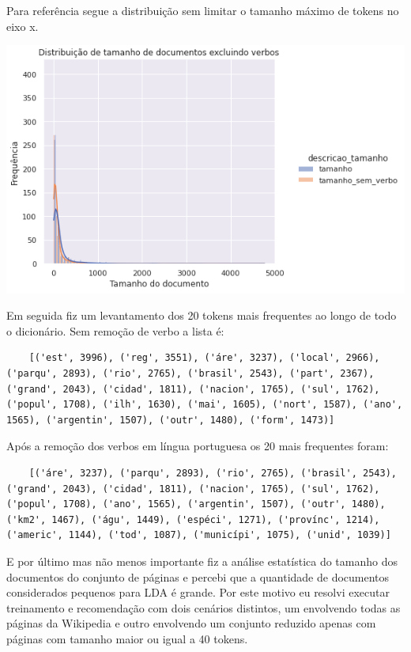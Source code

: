 Para referência segue a distribuição sem limitar o tamanho máximo de tokens no eixo x.

\vspace{3mm} %

\includegraphics[scale=0.75]{explore/resources/wp_comparacao_distribuicao_tamanhos_kde.png}

\vspace{3mm} %

Em seguida fiz um levantamento dos 20 tokens mais frequentes ao longo de todo o dicionário. Sem remoção de verbo a lista é:

\begin{lstlisting}
    [('est', 3996), ('reg', 3551), ('áre', 3237), ('local', 2966), ('parqu', 2893), ('rio', 2765), ('brasil', 2543), ('part', 2367), ('grand', 2043), ('cidad', 1811), ('nacion', 1765), ('sul', 1762), ('popul', 1708), ('ilh', 1630), ('mai', 1605), ('nort', 1587), ('ano', 1565), ('argentin', 1507), ('outr', 1480), ('form', 1473)]
\end{lstlisting}

Após a remoção dos verbos em língua portuguesa os 20 mais frequentes foram:

\begin{lstlisting}
    [('áre', 3237), ('parqu', 2893), ('rio', 2765), ('brasil', 2543), ('grand', 2043), ('cidad', 1811), ('nacion', 1765), ('sul', 1762), ('popul', 1708), ('ano', 1565), ('argentin', 1507), ('outr', 1480), ('km2', 1467), ('águ', 1449), ('espéci', 1271), ('provínc', 1214), ('americ', 1144), ('tod', 1087), ('municípi', 1075), ('unid', 1039)]    
\end{lstlisting}

E por último mas não menos importante fiz a análise estatística do tamanho dos documentos do conjunto de páginas e percebi que a quantidade de documentos
considerados pequenos para LDA é grande. Por este motivo eu resolvi executar treinamento e recomendação com dois cenários distintos, um envolvendo
todas as páginas da Wikipedia e outro envolvendo um conjunto reduzido apenas com páginas com tamanho maior ou igual a 40 tokens.

